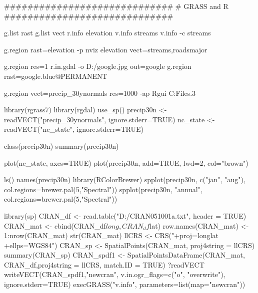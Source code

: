 
#############################
# GRASS and R
#############################

g.list rast
g.list vect
r.info elevation
v.info streams
v.info -c streams

g.region rast=elevation -p
nviz elevation vect=streams,roadsmajor

g.region res=1
r.in.gdal -o D:/google.jpg out=google
g.region rast=google.blue@PERMANENT

g.region vect=precip_30ynormals res=1000 -ap
Rgui
C:\Program Files\R{}.3\bin{}\Rgui

library(rgrass7)
library(rgdal)
use_sp()
precip30n <- readVECT("precip_30ynormals", ignore.stderr=TRUE)
nc_state <- readVECT("nc_state", ignore.stderr=TRUE)

class(precip30n)
summary(precip30n)

plot(nc_state, axes=TRUE)
plot(precip30n, add=TRUE, lwd=2, col="brown")

ls()
names(precip30n)
library(RColorBrewer)
spplot(precip30n, c("jan", "aug"), col.regions=brewer.pal(5,"Spectral"))
spplot(precip30n, "annual", col.regions=brewer.pal(5,"Spectral"))

library(sp)
CRAN_df <- read.table("D:/CRAN051001a.txt", header = TRUE)
CRAN_mat <- cbind(CRAN_df$long, CRAN_df$lat)
row.names(CRAN_mat) <- 1:nrow(CRAN_mat)
str(CRAN_mat)
llCRS <- CRS("+proj=longlat +ellps=WGS84")
CRAN_sp <- SpatialPoints(CRAN_mat, proj4string = llCRS)
summary(CRAN_sp)
CRAN_spdf1 <- SpatialPointsDataFrame(CRAN_mat, CRAN_df,proj4string = llCRS, match.ID = TRUE)
?readVECT
writeVECT(CRAN_spdf1,"newcran", v.in.ogr_flags=c("o", "overwrite"), ignore.stderr=TRUE)
execGRASS("v.info", parameters=list(map="newcran"))
